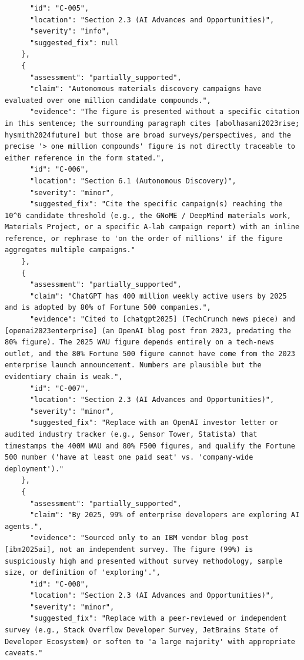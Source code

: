 \documentclass[11pt]{article}
\begin{document}
\begin{verbatim}
      "id": "C-005",
      "location": "Section 2.3 (AI Advances and Opportunities)",
      "severity": "info",
      "suggested_fix": null
    },
    {
      "assessment": "partially_supported",
      "claim": "Autonomous materials discovery campaigns have evaluated over one million candidate compounds.",
      "evidence": "The figure is presented without a specific citation in this sentence; the surrounding paragraph cites [abolhasani2023rise; hysmith2024future] but those are broad surveys/perspectives, and the precise '> one million compounds' figure is not directly traceable to either reference in the form stated.",
      "id": "C-006",
      "location": "Section 6.1 (Autonomous Discovery)",
      "severity": "minor",
      "suggested_fix": "Cite the specific campaign(s) reaching the 10^6 candidate threshold (e.g., the GNoME / DeepMind materials work, Materials Project, or a specific A-lab campaign report) with an inline reference, or rephrase to 'on the order of millions' if the figure aggregates multiple campaigns."
    },
    {
      "assessment": "partially_supported",
      "claim": "ChatGPT has 400 million weekly active users by 2025 and is adopted by 80% of Fortune 500 companies.",
      "evidence": "Cited to [chatgpt2025] (TechCrunch news piece) and [openai2023enterprise] (an OpenAI blog post from 2023, predating the 80% figure). The 2025 WAU figure depends entirely on a tech-news outlet, and the 80% Fortune 500 figure cannot have come from the 2023 enterprise launch announcement. Numbers are plausible but the evidentiary chain is weak.",
      "id": "C-007",
      "location": "Section 2.3 (AI Advances and Opportunities)",
      "severity": "minor",
      "suggested_fix": "Replace with an OpenAI investor letter or audited industry tracker (e.g., Sensor Tower, Statista) that timestamps the 400M WAU and 80% F500 figures, and qualify the Fortune 500 number ('have at least one paid seat' vs. 'company-wide deployment')."
    },
    {
      "assessment": "partially_supported",
      "claim": "By 2025, 99% of enterprise developers are exploring AI agents.",
      "evidence": "Sourced only to an IBM vendor blog post [ibm2025ai], not an independent survey. The figure (99%) is suspiciously high and presented without survey methodology, sample size, or definition of 'exploring'.",
      "id": "C-008",
      "location": "Section 2.3 (AI Advances and Opportunities)",
      "severity": "minor",
      "suggested_fix": "Replace with a peer-reviewed or independent survey (e.g., Stack Overflow Developer Survey, JetBrains State of Developer Ecosystem) or soften to 'a large majority' with appropriate caveats."

\end{verbatim}
\end{document}

